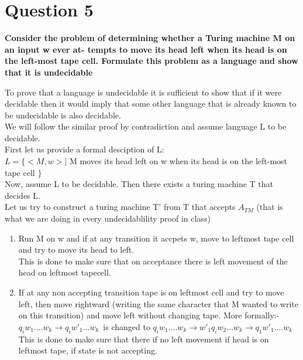 \documentclass{article}
\begin{document}
\pagebreak


\section{Question 5}

\textbf{Consider the problem of determining whether a Turing machine M on an input w ever at-
tempts to move its head left when its head is on the left-most tape cell. Formulate this
problem as a language and show that it is undecidable\\}

To prove that a language is undecidable it is sufficient to show that if it were decidable then it would imply
that some other language that is already known to be undecidable is also decidable.\\
We will follow the similar proof by contradiction and assume language L to be decidable.\\
First let us provide a formal desciption of L:\\
$L = \{ <M,w> | $ M moves its head left on w when its head is on the left-most tape cell $ \}$\\

Now, assume L to be decidable. Then there exists a turing machine T that decides L.\\
Let us try to construct a turing machine T' from T that accepts $A_{TM}$ (that is what we are doing in every undecidablility proof in class)
\begin{enumerate}
    \item Run M on w and if at any transition it accpets w, move to leftmost tape cell and try to move its head to left.\\
        This is done to make sure that on acceptance there is left movement of the head on leftmost tapecell.\\
    \item If at any non accepting transition tape is on leftmost cell and try to move left, then move rightward (writing the same character that M wanted to write on this transition) and move 
            left without changing tape. More formally:- \\
            $q_iw_1....w_k \rightarrow q_iw'_1...w_k $\ is changed to $q_iw_1....w_k \rightarrow w'_1q_iw_2...w_k \rightarrow q_1w'_1....w_k$\\
            This is done to make sure that there if no left movement if head is on leftmost tape, if state is not accepting.
\end{enumerate} 
\end{document}
